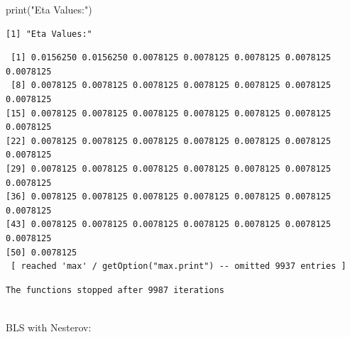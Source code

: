 \documentclass[
  letterpaper,
  DIV=11,
  numbers=noendperiod]{scrartcl}
\newenvironment{Shaded}{\begin{snugshade}}{\end{snugshade}}
\newcommand{\FunctionTok}[1]{\textcolor[rgb]{0.28,0.35,0.67}{#1}}
\newcommand{\NormalTok}[1]{\textcolor[rgb]{0.00,0.23,0.31}{#1}}
\newcommand{\SpecialCharTok}[1]{\textcolor[rgb]{0.37,0.37,0.37}{#1}}
\newcommand{\StringTok}[1]{\textcolor[rgb]{0.13,0.47,0.30}{#1}}
\begin{document}
\begin{Shaded}
\begin{Highlighting}[]
\FunctionTok{print}\NormalTok{(}\StringTok{"Eta Values:"}\NormalTok{)}
\end{Highlighting}
\end{Shaded}

\begin{verbatim}
[1] "Eta Values:"
\end{verbatim}

\begin{Shaded}
\end{Shaded}

\begin{verbatim}
 [1] 0.0156250 0.0156250 0.0078125 0.0078125 0.0078125 0.0078125 0.0078125
 [8] 0.0078125 0.0078125 0.0078125 0.0078125 0.0078125 0.0078125 0.0078125
[15] 0.0078125 0.0078125 0.0078125 0.0078125 0.0078125 0.0078125 0.0078125
[22] 0.0078125 0.0078125 0.0078125 0.0078125 0.0078125 0.0078125 0.0078125
[29] 0.0078125 0.0078125 0.0078125 0.0078125 0.0078125 0.0078125 0.0078125
[36] 0.0078125 0.0078125 0.0078125 0.0078125 0.0078125 0.0078125 0.0078125
[43] 0.0078125 0.0078125 0.0078125 0.0078125 0.0078125 0.0078125 0.0078125
[50] 0.0078125
 [ reached 'max' / getOption("max.print") -- omitted 9937 entries ]
\end{verbatim}

\begin{Shaded}
\end{Shaded}

\begin{verbatim}
The functions stopped after 9987 iterations 
 
\end{verbatim}

BLS with Nesterov:
\end{document}
